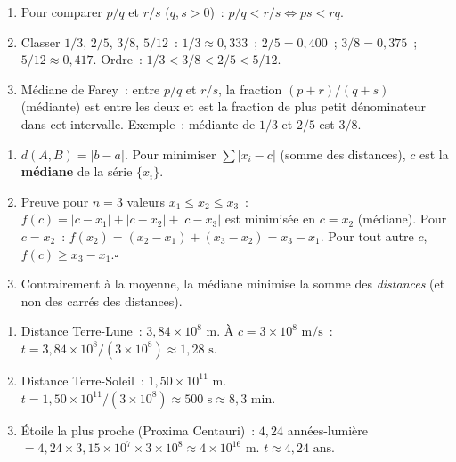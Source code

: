 
\begin{enumerate}
  \item Pour comparer $p/q$ et $r/s$ ($q,s>0$)~: $p/q<r/s\Leftrightarrow ps<rq$.
  \item Classer $1/3$, $2/5$, $3/8$, $5/12$~:
        $1/3\approx0{,}333$~; $2/5=0{,}400$~; $3/8=0{,}375$~; $5/12\approx0{,}417$.
        Ordre~: $1/3<3/8<2/5<5/12$.
  \item M\'ediane de Farey~: entre $p/q$ et $r/s$, la fraction $(p+r)/(q+s)$ (m\'ediante)
        est entre les deux et est la fraction de plus petit d\'enominateur dans cet intervalle.
        Exemple~: m\'ediante de $1/3$ et $2/5$ est $3/8$.\checkmark
\end{enumerate}


\begin{enumerate}
  \item $d(A,B)=|b-a|$. Pour minimiser $\sum|x_i-c|$ (somme des distances),
        $c$ est la \textbf{m\'ediane} de la s\'erie $\{x_i\}$.
  \item Preuve pour $n=3$ valeurs $x_1\leq x_2\leq x_3$~:
        $f(c)=|c-x_1|+|c-x_2|+|c-x_3|$ est minimis\'ee en $c=x_2$ (m\'ediane).
        Pour $c=x_2$~: $f(x_2)=(x_2-x_1)+(x_3-x_2)=x_3-x_1$.
        Pour tout autre $c$, $f(c)\geq x_3-x_1$.\hfill$\square$
  \item Contrairement \`a la moyenne, la m\'ediane minimise la somme des
        \emph{distances} (et non des carr\'es des distances).
\end{enumerate}


\begin{enumerate}
  \item Distance Terre-Lune~: $3{,}84\times10^8\text{ m}$.
        \`A $c=3\times10^8\text{ m/s}$~: $t=3{,}84\times10^8/(3\times10^8)\approx1{,}28\text{ s}$.
  \item Distance Terre-Soleil~: $1{,}50\times10^{11}\text{ m}$.
        $t=1{,}50\times10^{11}/(3\times10^8)\approx500\text{ s}\approx8{,}3\text{ min}$.
  \item \'Etoile la plus proche (Proxima Centauri)~: $4{,}24$ ann\'ees-lumi\`ere
        $=4{,}24\times3{,}15\times10^7\times3\times10^8\approx4\times10^{16}\text{ m}$.
        $t\approx4{,}24\text{ ans}$.
\end{enumerate}


